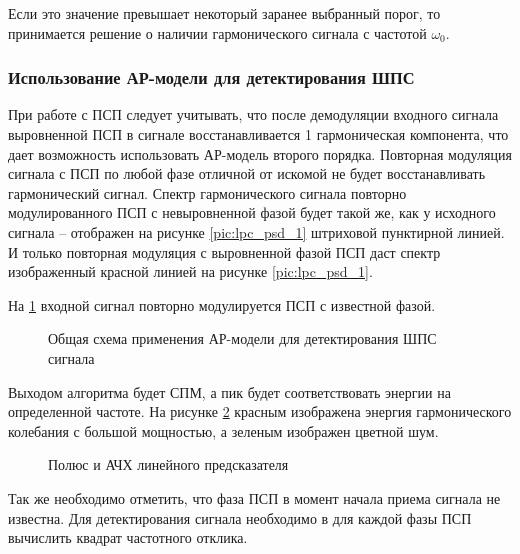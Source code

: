 Если это значение превышает некоторый заранее выбранный порог, то принимается решение о наличии гармонического
сигнала с частотой ${\omega_0}$. 

\subsubsection{Использование АР-модели для детектирования ШПС}
\label{ssec2:lpc_cdma_detect}

При работе с ПСП следует учитывать, что после демодуляции входного сигнала выровненной ПСП в сигнале восстанавливается 1 гармоническая
компонента, что дает возможность использовать АР-модель второго порядка.
Повторная модуляция сигнала с ПСП по любой фазе отличной от искомой не будет восстанавливать гармонический сигнал.
Спектр гармонического сигнала повторно модулированного ПСП с невыровненной фазой будет такой же, как у исходного сигнала – отображен
на рисунке \ref{pic:lpc_psd_1} штриховой пунктирной линией. И только повторная модуляция с выровненной фазой ПСП даст спектр
изображенный красной линией на рисунке \ref{pic:lpc_psd_1}.

На \ref{pic:lpc_basic1} входной сигнал повторно модулируется ПСП с известной фазой.

\begin{figure}[H]
	\center{}
	\caption{Общая схема применения АР-модели для детектирования ШПС сигнала}
	\label{pic:lpc_basic1}
\end{figure}

Выходом алгоритма будет СПМ, а пик будет соответствовать энергии на определенной частоте. На рисунке
\ref{pic:lpc_poles_gps} красным изображена энергия гармонического колебания с большой мощностью, а
зеленым изображен цветной шум.
\begin{figure}[H]
	\center{}
	\caption{Полюс и АЧХ линейного предсказателя}
	\label{pic:lpc_poles_gps}
\end{figure}

Так же необходимо отметить, что фаза ПСП в момент начала приема сигнала не известна.
Для детектирования сигнала необходимо в для каждой фазы ПСП вычислить квадрат частотного
отклика.

